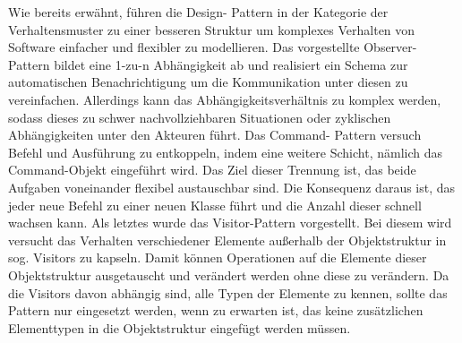Wie bereits erwähnt, führen die Design- Pattern in der Kategorie der Verhaltensmuster zu einer besseren Struktur um komplexes Verhalten von Software einfacher und flexibler zu modellieren. 
Das vorgestellte Observer- Pattern bildet  eine 1-zu-n Abhängigkeit ab und realisiert ein Schema zur automatischen Benachrichtigung um die Kommunikation unter diesen zu vereinfachen. Allerdings kann das Abhängigkeitsverhältnis zu komplex werden, sodass dieses zu schwer nachvollziehbaren Situationen oder zyklischen Abhängigkeiten unter den Akteuren führt.
Das Command- Pattern versuch Befehl und Ausführung zu entkoppeln, indem eine weitere Schicht, nämlich das Command-Objekt eingeführt wird. Das Ziel dieser Trennung ist, das beide Aufgaben voneinander flexibel austauschbar sind. Die Konsequenz daraus ist, das jeder neue Befehl zu einer neuen Klasse führt und die Anzahl dieser schnell wachsen kann.
Als letztes wurde das Visitor-Pattern vorgestellt. Bei diesem wird versucht das Verhalten verschiedener Elemente außerhalb der Objektstruktur in sog. Visitors zu kapseln. Damit können Operationen auf die Elemente dieser Objektstruktur ausgetauscht und verändert werden ohne diese zu verändern. Da die Visitors davon abhängig sind, alle Typen der Elemente zu kennen, sollte das Pattern nur eingesetzt werden, wenn zu erwarten ist, das keine zusätzlichen Elementtypen in die Objektstruktur eingefügt werden müssen.



